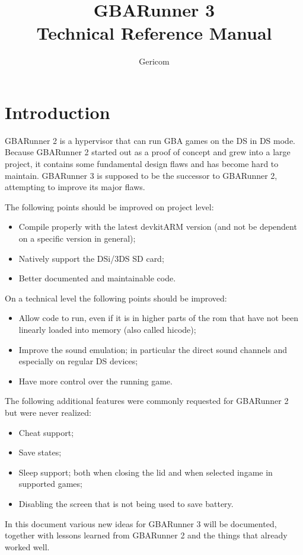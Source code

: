 \documentclass[a4paper,10pt]{report}
\title{GBARunner 3\\Technical Reference Manual}
\author{Gericom}
\begin{document}
\maketitle
\tableofcontents
\chapter{Introduction}
	GBARunner 2 is a hypervisor that can run GBA games on the DS in DS mode. Because GBARunner 2 started out as a proof of concept and grew into a large project, it contains some fundamental design flaws and has become hard to maintain. GBARunner 3 is supposed to be the successor to GBARunner 2, attempting to improve its major flaws.
	
	The following points should be improved on project level:
	\begin{itemize}
		\item Compile properly with the latest devkitARM version (and not be dependent on a specific version in general);
		\item Natively support the DSi/3DS SD card;
		\item Better documented and maintainable code.
	\end{itemize}

	On a technical level the following points should be improved:
	\begin{itemize}
		\item Allow code to run, even if it is in higher parts of the rom that have not been linearly loaded into memory (also called hicode);
		\item Improve the sound emulation; in particular the direct sound channels and especially on regular DS devices;
		\item Have more control over the running game.
	\end{itemize}

	The following additional features were commonly requested for GBARunner 2 but were never realized:
	\begin{itemize}
		\item Cheat support;
		\item Save states;
		\item Sleep support; both when closing the lid and when selected ingame in supported games;
		\item Disabling the screen that is not being used to save battery.
	\end{itemize}

	In this document various new ideas for GBARunner 3 will be documented, together with lessons learned from GBARunner 2 and the things that already worked well.
\end{document}
